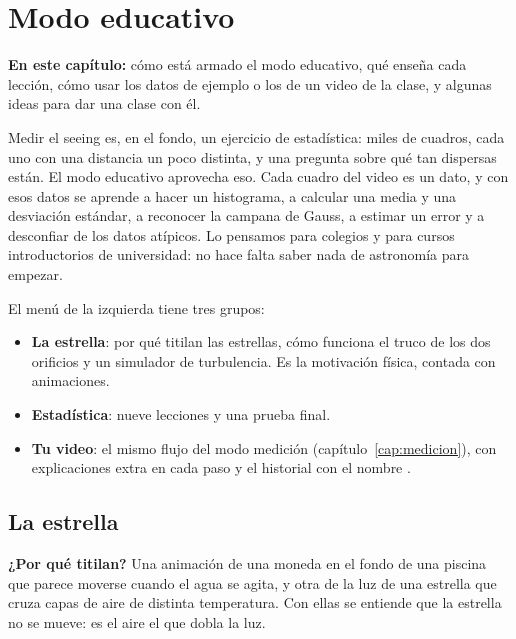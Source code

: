 \chapter{Modo educativo}\label{cap:educativo}

\begin{resumen}
\textbf{En este capítulo:} cómo está armado el modo educativo, qué enseña cada lección, cómo usar los datos de ejemplo o
los de un video de la clase, y algunas ideas para dar una clase con él.
\end{resumen}

Medir el seeing es, en el fondo, un ejercicio de estadística: miles de cuadros, cada uno con una distancia un poco
distinta, y una pregunta sobre qué tan dispersas están. El modo educativo aprovecha eso. Cada cuadro del video es un
dato, y con esos datos se aprende a hacer un histograma, a calcular una media y una desviación estándar, a reconocer la
campana de Gauss, a estimar un error y a desconfiar de los datos atípicos. Lo pensamos para colegios y para cursos
introductorios de universidad: no hace falta saber nada de astronomía para empezar.


El menú de la izquierda tiene tres grupos:
\begin{itemize}
\item \textbf{La estrella}: por qué titilan las estrellas, cómo funciona el truco de los dos orificios y un simulador
de turbulencia. Es la motivación física, contada con animaciones.
\item \textbf{Estadística}: nueve lecciones y una prueba final.
\item \textbf{Tu video}: el mismo flujo del modo medición (capítulo~\ref{cap:medicion}), con explicaciones extra en cada
paso y el historial con el nombre .
\end{itemize}

\section{La estrella}

\textbf{¿Por qué titilan?} Una animación de una moneda en el fondo de una piscina que parece moverse cuando el agua se
agita, y otra de la luz de una estrella que cruza capas de aire de distinta temperatura. Con ellas se entiende que la
estrella no se mueve: es el aire el que dobla la luz.

